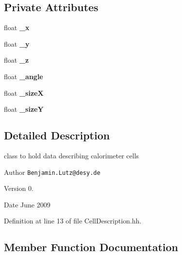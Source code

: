 \subsection*{Private Attributes}
\begin{DoxyCompactItemize}
\item 
float {\bfseries \-\_\-x}\label{classCALICE_1_1CellDescription_a7fb41b8afeb9685ae79637ec5468d553}

\item 
float {\bfseries \-\_\-y}\label{classCALICE_1_1CellDescription_a26ec9fdc2f9c3f378174e9ac230ab8ea}

\item 
float {\bfseries \-\_\-z}\label{classCALICE_1_1CellDescription_ac47492d24aa6e1a1f690ede7ec761f90}

\item 
float {\bfseries \-\_\-angle}\label{classCALICE_1_1CellDescription_ae7ec071cb586209c1a875aeaf9668832}

\item 
float {\bfseries \-\_\-size\-X}\label{classCALICE_1_1CellDescription_ae44c3d85f32117dff76664abfcf0c670}

\item 
float {\bfseries \-\_\-size\-Y}\label{classCALICE_1_1CellDescription_acd70a2b79f5fc53f0b5c422cab9ae337}

\end{DoxyCompactItemize}


\subsection{Detailed Description}
class to hold data describing calorimeter cells 

\begin{DoxyAuthor}{Author}
{\tt Benjamin.\-Lutz@desy.\-de} 
\end{DoxyAuthor}
\begin{DoxyVersion}{Version}
0. 
\end{DoxyVersion}
\begin{DoxyDate}{Date}
June 2009 
\end{DoxyDate}


Definition at line 13 of file Cell\-Description.\-hh.



\subsection{Member Function Documentation}
